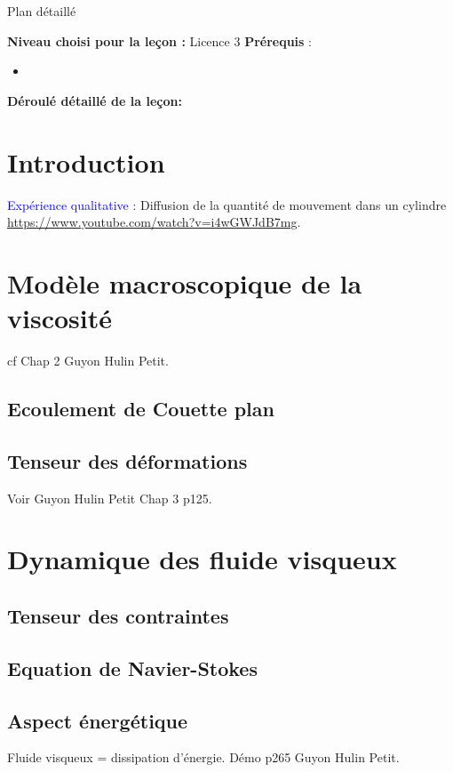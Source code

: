\begin{reportBlock}{Plan détaillé}

  \textbf{Niveau choisi pour la leçon :} Licence 3
  \newline
  \textbf{Prérequis} : \begin{itemize}
      \item 
  \end{itemize}

  \textbf{Déroulé détaillé de la leçon: }  
  
  \section*{Introduction}
\textcolor{blue}{Expérience qualitative :} Diffusion de la quantité de mouvement dans un cylindre \url{https://www.youtube.com/watch?v=i4wGWJdB7mg}.

  \section{Modèle macroscopique de la viscosité}
cf Chap 2 Guyon Hulin Petit.
  \subsection{Ecoulement de Couette plan}

  \subsection{Tenseur des déformations}
  Voir Guyon Hulin Petit Chap 3 p125.


  \section{Dynamique des fluide visqueux}
  
\subsection{Tenseur des contraintes}

\subsection{Equation de Navier-Stokes}

\subsection{Aspect énergétique}
Fluide visqueux = dissipation d'énergie. Démo p265 Guyon Hulin Petit.

\end{reportBlock}
